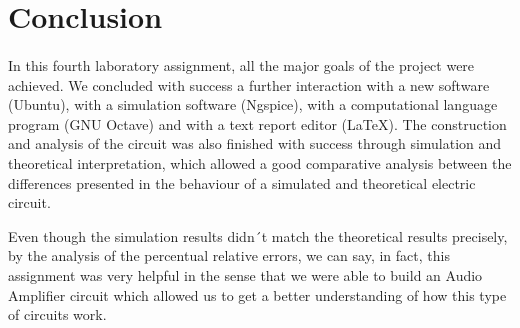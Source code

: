 \section{Conclusion}
\label{sec:conclusion}

\paragraph{}
In this fourth laboratory assignment, all the major goals of the project were achieved. We concluded with success a further interaction with a new software (Ubuntu), with a simulation software (Ngspice), with a computational language program (GNU Octave) and with a text report editor (LaTeX). The construction and analysis of the circuit was also finished with success through simulation and theoretical interpretation, which allowed a good comparative analysis between the differences presented in the behaviour of a simulated and theoretical electric circuit. 

Even though the simulation results didn´t match the theoretical results precisely, by the analysis of the percentual relative errors, we can say, in fact, this assignment was very helpful in the sense that we were able to build an Audio Amplifier circuit which allowed us to get a better understanding of how this type of circuits work.

